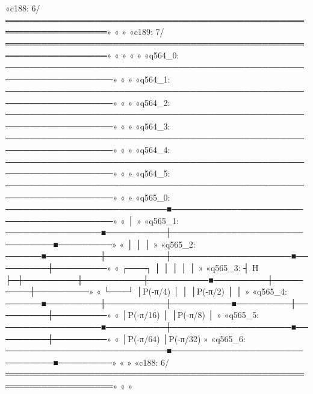 «c188: 6/═══════════════════════════════════════════════════════════════════»
«                                                                           »
«c189: 7/═══════════════════════════════════════════════════════════════════»
«                                                                           »
«                                                                            »
«q564_0: ────────────────────────────────────────────────────────────────────»
«                                                                            »
«q564_1: ────────────────────────────────────────────────────────────────────»
«                                                                            »
«q564_2: ────────────────────────────────────────────────────────────────────»
«                                                                            »
«q564_3: ────────────────────────────────────────────────────────────────────»
«                                                                            »
«q564_4: ────────────────────────────────────────────────────────────────────»
«                                                                            »
«q564_5: ────────────────────────────────────────────────────────────────────»
«                                                                            »
«q565_0: ───────────────────────────■────────────────────────────────────────»
«                                   │                                        »
«q565_1: ────────────────■──────────┼──────────────────────────────■─────────»
«                        │          │                              │         »
«q565_2: ──────■─────────┼──────────┼────────────────────■─────────┼─────────»
«        ┌───┐ │         │          │                    │         │         »
«q565_3: ┤ H ├─┼─────────┼──────────┼──────────■─────────┼─────────┼─────────»
«        └───┘ │P(-π/4)  │          │          │P(-π/2)  │         │         »
«q565_4: ──────■─────────┼──────────┼──────────■─────────┼─────────┼─────────»
«                        │P(-π/16)  │                    │P(-π/8)  │         »
«q565_5: ────────────────■──────────┼────────────────────■─────────┼─────────»
«                                   │P(-π/64)                      │P(-π/32) »
«q565_6: ───────────────────────────■──────────────────────────────■─────────»
«                                                                            »
«c188: 6/════════════════════════════════════════════════════════════════════»
«                                                                            »
